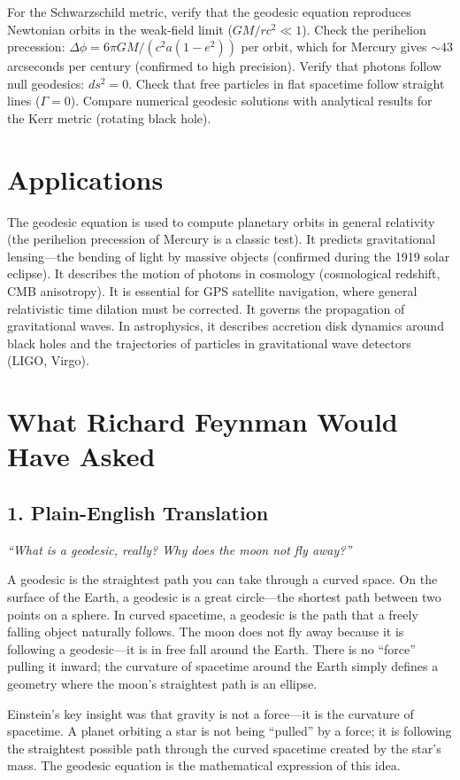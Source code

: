 \documentclass[11pt,openright]{book}
\begin{document}
For the Schwarzschild metric, verify that the geodesic equation reproduces Newtonian orbits in the weak-field limit ($GM/rc^2 \ll 1$). Check the perihelion precession: $\Delta\phi = 6\pi GM/(c^2 a(1-e^2))$ per orbit, which for Mercury gives $\sim 43$ arcseconds per century (confirmed to high precision). Verify that photons follow null geodesics: $ds^2 = 0$. Check that free particles in flat spacetime follow straight lines ($\Gamma = 0$). Compare numerical geodesic solutions with analytical results for the Kerr metric (rotating black hole).
\section*{Applications}

The geodesic equation is used to compute planetary orbits in general relativity (the perihelion precession of Mercury is a classic test). It predicts gravitational lensing---the bending of light by massive objects (confirmed during the 1919 solar eclipse). It describes the motion of photons in cosmology (cosmological redshift, CMB anisotropy). It is essential for GPS satellite navigation, where general relativistic time dilation must be corrected. It governs the propagation of gravitational waves. In astrophysics, it describes accretion disk dynamics around black holes and the trajectories of particles in gravitational wave detectors (LIGO, Virgo).
\section*{What Richard Feynman Would Have Asked}

\subsection*{1. Plain-English Translation}
\textit{``What is a geodesic, really? Why does the moon not fly away?''}

A geodesic is the straightest path you can take through a curved space. On the surface of the Earth, a geodesic is a great circle---the shortest path between two points on a sphere. In curved spacetime, a geodesic is the path that a freely falling object naturally follows. The moon does not fly away because it is following a geodesic---it is in free fall around the Earth. There is no ``force'' pulling it inward; the curvature of spacetime around the Earth simply defines a geometry where the moon's straightest path is an ellipse.

Einstein's key insight was that gravity is not a force---it is the curvature of spacetime. A planet orbiting a star is not being ``pulled'' by a force; it is following the straightest possible path through the curved spacetime created by the star's mass. The geodesic equation is the mathematical expression of this idea.
\end{document}
